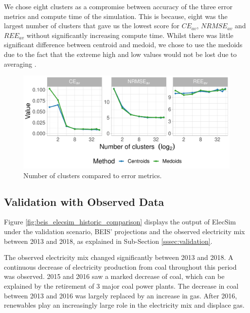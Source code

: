 We chose eight clusters as a compromise between accuracy of the three error metrics and compute time of the simulation. This is because, eight was the largest number of clusters that gave us the lowest score for $CE_{av}$, $NRMSE_{av}$ and $REE_{av}$ without significantly increasing compute time. Whilst there was little significant difference between centroid and medoid, we chose to use the medoids due to the fact that the extreme high and low values would not be lost due to averaging \cite{Hilbers2019}.




\begin{figure}
	\centering
	\includegraphics[width=\textwidth]{Chapter4/figures/e-Energy-2020/methods_and_materials/clusters_compared_ggplot.pdf}
	\caption{Number of clusters compared to error metrics.}
	\label{fig:error_metrics_vs_cluster_number}
\end{figure}



\subsection{Validation with Observed Data}

Figure \ref{fig:beis_elecsim_historic_comparison} displays the output of ElecSim under the validation scenario, BEIS' projections and the observed electricity mix between 2013 and 2018, as explained in Sub-Section \ref{sssec:validation}.

The observed electricity mix changed significantly between 2013 and 2018. A continuous decrease of electricity production from coal throughout this period was observed. 2015 and 2016 saw a marked decrease of coal, which can be explained by the retirement of 3 major coal power plants. The decrease in coal between 2013 and 2016 was largely replaced by an increase in gas. After 2016, renewables play an increasingly large role in the electricity mix and displace gas.

